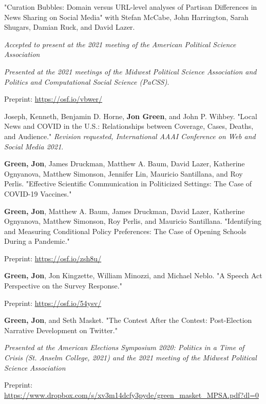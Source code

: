 \documentclass[letterpaper]{article}
\renewenvironment{itemize}{
  \begin{list}{}{
    \setlength{\leftmargin}{1.5em}
  }
}{
  \end{list}
}
\begin{document}
\begin{itemize}
\item "Curation Bubbles: Domain versus URL-level analyses of Partisan Differences in News Sharing on Social Media" with Stefan McCabe, John Harrington, Sarah Shugars, Damian Ruck, and David Lazer.
\begin{itemize}
\item \textit{Accepted to present at the 2021 meeting of the American Political Science Association}
\item \textit{Presented at the 2021 meetings of the Midwest Political Science Association and Politics and Computational Social Science (PaCSS)}.
\item Preprint: \url{https://osf.io/vbwer/}
\end{itemize} 

\item Joseph, Kenneth, Benjamin D. Horne, \textbf{Jon Green}, and John P. Wihbey. "Local News and COVID in the U.S.: Relationships between Coverage, Cases, Deaths, and Audience." \textit{Revision requested, International AAAI Conference on Web and Social Media 2021}.

\item  \textbf{Green, Jon}, James Druckman, Matthew A. Baum, David Lazer, Katherine Ognyanova, Matthew Simonson, Jennifer Lin, Mauricio Santillana, and Roy Perlis. "Effective Scientific Communication in Politicized Settings: The Case of COVID-19 Vaccines."

\item  \textbf{Green, Jon}, Matthew A. Baum, James Druckman, David Lazer, Katherine Ognyanova, Matthew Simonson, Roy Perlis, and Mauricio Santillana. "Identifying and Measuring Conditional Policy Preferences: The Case of Opening Schools During a Pandemic." 
\begin{itemize}
\item Preprint: \url{https://osf.io/zsh8u/}
\end{itemize}

\item \textbf{Green, Jon}, Jon Kingzette, William Minozzi, and Michael Neblo. "A Speech Act Perspective on the Survey Response." 
\begin{itemize}
\item Preprint: \url{https://osf.io/54ysv/}
\end{itemize}

\item \textbf{Green, Jon}, and Seth Masket. "The Contest After the Contest: Post-Election Narrative Development on Twitter." 
\begin{itemize}
\item \textit{Presented at the American Elections Symposium 2020: Politics in a Time of Crisis (St. Anselm College, 2021) and the 2021 meeting of the Midwest Political Science Association}
\item Preprint: \url{https://www.dropbox.com/s/xv3m14dcfy3pyde/green_masket_MPSA.pdf?dl=0}
\end{itemize}


\end{itemize}
\end{document}
